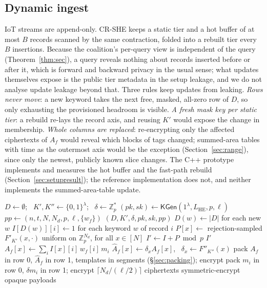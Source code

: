 \documentclass[a4paper,fleqn]{cas-sc}
\begin{document}
\subsection{Dynamic ingest}
\label{sec:ingest}
IoT streams are append-only. CR-SHE keeps a static tier and a hot buffer of at
most $B$ records scanned by the same contraction, folded into a rebuilt tier
every $B$ insertions. Because the coalition's per-query view is independent of
the query (Theorem~\ref{thm:sec}), a query reveals nothing about records
inserted before or after it, which is forward and backward privacy in the usual
sense; what updates themselves expose is the public tier metadata in the setup
leakage, and we do not analyse update leakage beyond that.
Three rules keep updates from leaking. \emph{Rows never move}: a new keyword
takes the next free, masked, all-zero row of $D$, so only exhausting the
provisioned headroom is visible. \emph{A fresh mask key per static tier}: a
rebuild re-lays the record axis, and reusing $K'$ would expose the change in
membership. \emph{Whole columns are replaced}: re-encrypting only the affected
ciphertexts of $A_f$ would reveal which blocks of tags changed; summed-area
tables with time as the outermost axis would be the exception
(Section~\ref{sec:range}), since only the newest, publicly known slice changes.
The C++ prototype implements and measures the hot buffer and the fast-path
rebuild (Section~\ref{sec:setupresult}); the reference implementation does
not, and neither implements the summed-area-table update.

\begin{algorithm}[t]
\footnotesize
\caption{Outsourcing at the data owner.}
\label{alg:outsource}
\begin{algorithmic}[1]
  \State $D\gets\emptyset$; \ $K',K''\gets\{0,1\}^\lambda$; \
         $\delta\gets\mathbb{Z}_p^{*}$
  \State $(pk,sk)\gets\mathsf{KGen}(1^\lambda,L_{\mathrm{HE}},p,\ell)$
  \State $pp\gets(n,t,N,N_d,p,\ell,\{w_f\})$
  \State \Return $(D,K',\delta,pk,sk,pp)$
\EndProcedure
\Statex
{}
  \State $D(w)\gets|D|$ for each new $w$
  \State $I[D(w)][i]\gets 1$ for each keyword $w$ of record $i$
  \State $P[x]\gets$ rejection-sampled $F'_{K'}(x,\cdot)$
  \Statex \hfill uniform on $\mathbb{Z}_p^{N_d}$, for all $x\in[N]$
  \State $I'\gets I+P \bmod p$
  \State \Return $I'$ 
\EndProcedure
\Statex
{}
    \State $A_f[x]\gets\sum_i I[x][i]\,w_f[i]\,m_i$
    \State $\widehat{A}_f[x]\gets\delta_x A_f[x]$,
           \ $\delta_x\gets F''_{K''}(x)$
    \State pack $A_f$ in row 0, $\widehat{A}_f$ in row 1,
    \Statex \hfill templates in segments (\S\ref{sec:packing}); encrypt
  \EndFor
\EndProcedure
\Statex
{}
  \State pack $m_i$ in row 0, $\delta m_i$ in row 1; encrypt
  \Statex \hfill $\lceil N_d/(\ell/2)\rceil$ ciphertexts
  \State symmetric-encrypt opaque payloads
\EndProcedure
\end{algorithmic}
\end{algorithm}
\end{document}
